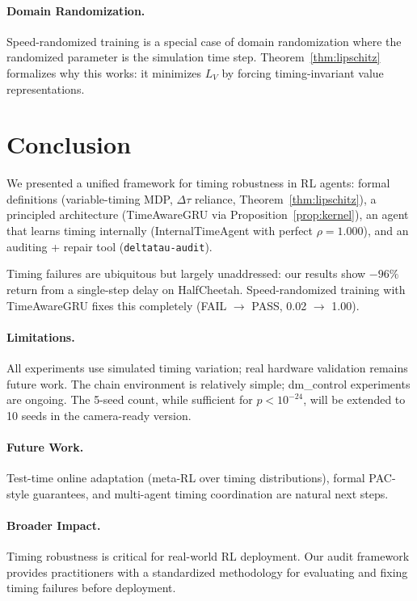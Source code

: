 \documentclass[10pt,twocolumn]{article}
\newcommand{\deltatau}{\Delta\tau}
\theoremstyle{plain}
\theoremstyle{definition}
\begin{document}
\paragraph{Domain Randomization.}
Speed-randomized training is a special case of domain randomization
\cite{tobin2017domain} where the randomized parameter is the simulation time step.
Theorem~\ref{thm:lipschitz} formalizes why this works: it minimizes $L_V$ by
forcing timing-invariant value representations.

\section{Conclusion}
\label{sec:conclusion}

We presented a unified framework for timing robustness in RL agents:
formal definitions (variable-timing MDP, $\deltatau$ reliance, Theorem~\ref{thm:lipschitz}),
a principled architecture (TimeAwareGRU via Proposition~\ref{prop:kernel}),
an agent that learns timing internally (InternalTimeAgent with perfect $\rho=1.000$),
and an auditing + repair tool (\texttt{deltatau-audit}).

Timing failures are ubiquitous but largely unaddressed: our results show
$-96\%$ return from a single-step delay on HalfCheetah. Speed-randomized
training with TimeAwareGRU fixes this completely (FAIL $\to$ PASS, 0.02 $\to$ 1.00).

\paragraph{Limitations.}
All experiments use simulated timing variation; real hardware validation
remains future work. The chain environment is relatively simple; dm\_control
experiments are ongoing. The 5-seed count, while sufficient for $p < 10^{-24}$,
will be extended to 10 seeds in the camera-ready version.

\paragraph{Future Work.}
Test-time online adaptation (meta-RL over timing distributions), formal
PAC-style guarantees, and multi-agent timing coordination are natural next steps.

\paragraph{Broader Impact.}
Timing robustness is critical for real-world RL deployment. Our audit framework
provides practitioners with a standardized methodology for evaluating and fixing
timing failures before deployment.
\end{document}
